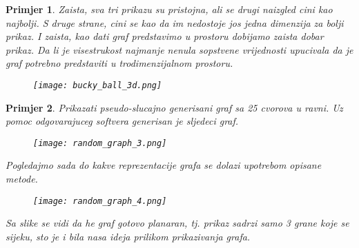 \documentclass[11pt]{article}
\newtheorem{example}{Primjer}
\begin{document}
\begin{example}
        Zaista, sva tri prikazu su pristojna, ali se drugi naizgled cini kao najbolji.
        S druge strane, cini se kao da im nedostoje jos jedna dimenzija za bolji prikaz. I zaista, kao dati graf predstavimo u prostoru dobijamo zaista dobar prikaz.
        Da li je visestrukost najmanje nenula sopstvene vrijednosti upucivala da je graf potrebno predstaviti u trodimenzijalnom prostoru.

        \begin{figure}[h]
            \centering
            \texttt{[image: bucky\_ball\_3d.png]}
        \end{figure}
        
    \end{example}
    
    \begin{example}
        Prikazati pseudo-slucajno generisani graf sa 25 cvorova u ravni.
        Uz pomoc odgovarajuceg softvera generisan je sljedeci graf.
        
        \begin{figure}[h]
            \centering
            \texttt{[image: random\_graph\_3.png]}
        \end{figure}
        
        Pogledajmo sada do kakve reprezentacije grafa se dolazi upotrebom opisane metode.
        
        \begin{figure}[h]
            \centering
            \texttt{[image: random\_graph\_4.png]}
        \end{figure}

        Sa slike se vidi da he graf gotovo planaran, tj. prikaz sadrzi samo 3 grane koje se sijeku, sto je i bila nasa ideja prilikom prikazivanja grafa.
    \end{example}

    
	
\end{document}
